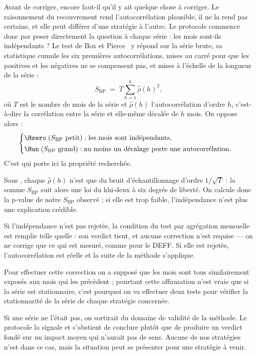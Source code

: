 Avant de corriger, encore faut-il qu'il y ait quelque chose à corriger. Le
raisonnement du recouvrement rend l'autocorrélation plausible, il ne la rend
pas certaine, et elle peut différer d'une stratégie à l'autre. Le protocole
commence donc par poser directement la question à chaque série : les mois
sont-ils indépendants ? Le test de Box et Pierce~\cite{boxpierce1970} y répond sur la série brute,
sa statistique cumule les six premières autocorrélations, mises au carré pour
que les positives et les négatives ne se compensent pas, et mises à l'échelle
de la longueur de la série :
\[
  S_{\mathrm{BP}} \;=\; T \sum_{h=1}^{6} \hat\rho(h)^2 ,
\]
où \(T\) est le nombre de mois de la série et \(\hat\rho(h)\)
l'autocorrélation d'ordre \(h\), c'est-à-dire la corrélation entre la série
et elle-même décalée de \(h\) mois. On oppose alors :
\[
  \begin{cases}
    \Hzero \;(S_{\mathrm{BP}} \text{ petit}) : \text{les mois sont indépendants,}\\[2pt]
    \Hun \;(S_{\mathrm{BP}} \text{ grand}) : \text{au moins un décalage porte une autocorrélation.}
  \end{cases}
\]
C'est \Hzero{} qui porte ici la propriété recherchée.

Sous \Hzero{}, chaque $\hat\rho(h)$ n'est que du bruit d'échantillonnage
d'ordre $1/\sqrt{T}$ : la somme $S_{\mathrm{BP}}$ suit alors une loi du
khi-deux à six degrés de liberté. On calcule donc la p-value
de notre $S_{\mathrm{BP}}$ observé ; si elle est trop faible, l'indépendance
n'est plus une explication crédible.

Si l'indépendance n'est pas rejetée, la condition du test par
agrégation mensuelle est remplie telle quelle : son verdict tient, et aucune
correction n'est requise — on ne corrige que ce qui est mesuré, comme pour le
DEFF. Si elle est rejetée, l'autocorrélation est réelle et la suite de la
méthode s'applique.

Pour effectuer cette correction on a supposé que les mois sont tous
similairement exposés aux mois qui les précèdent ; pourtant cette affirmation
n'est vraie que si la série est stationnaire, c'est pourquoi on va effectuer
deux tests pour vérifier la stationnarité de la série de chaque stratégie
concernée.

Si une série ne l'était pas, on sortirait du domaine de validité de la
méthode. Le protocole la signale et s'abstient de conclure plutôt que de
produire un verdict fondé sur un impact moyen qui n'aurait pas de sens. Aucune
de nos stratégies n'est dans ce cas, mais la situation peut se présenter pour
une stratégie à venir.

